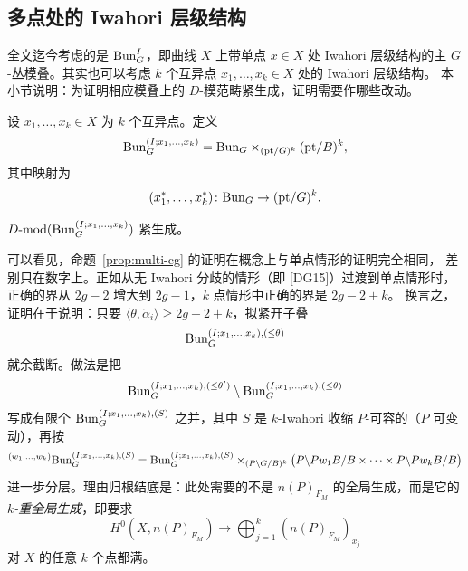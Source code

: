 
\subsection{多点处的 Iwahori 层级结构}
\label{sec:multi}

全文迄今考虑的是 $\mathrm{Bun}^I_G$，即曲线 $X$ 上带单点 $x\in X$ 处 Iwahori 层级结构的主
$G$-丛模叠。其实也可以考虑 $k$ 个互异点 $x_1,\dots,x_k\in X$ 处的 Iwahori 层级结构。
本小节说明：为证明相应模叠上的 $D$-模范畴紧生成，证明需要作哪些改动。

\begin{definition}
\label{def:multi-bunI}
设 $x_1,\dots,x_k\in X$ 为 $k$ 个互异点。定义
\[
\mathrm{Bun}^{(I;x_1,\dots,x_k)}_G=\mathrm{Bun}_G\times_{(\mathrm{pt}/G)^k}(\mathrm{pt}/B)^k,
\]
其中映射为
\[
(x_1^*,\dots,x_k^*)\colon \mathrm{Bun}_G\to (\mathrm{pt}/G)^k .
\]
\end{definition}

\begin{proposition}
\label{prop:multi-cg}
$D\text{-}\mathrm{mod}(\mathrm{Bun}^{(I;x_1,\dots,x_k)}_G)$ 紧生成。
\end{proposition}

可以看见，命题~\ref{prop:multi-cg} 的证明在概念上与单点情形的证明完全相同，
差别只在数字上。正如从无 Iwahori 分歧的情形（即 [DG15]）过渡到单点情形时，
正确的界从 $2g-2$ 增大到 $2g-1$，$k$ 点情形中正确的界是 $2g-2+k$。
换言之，证明在于说明：只要 $\langle\theta,\check\alpha_i\rangle\ge 2g-2+k$，拟紧开子叠
\[
\mathrm{Bun}^{(I;x_1,\dots,x_k),(\le\theta)}_G
\]
就余截断。做法是把
\[
\mathrm{Bun}^{(I;x_1,\dots,x_k),(\le\theta')}_G
\setminus \mathrm{Bun}^{(I;x_1,\dots,x_k),(\le\theta)}_G
\]
写成有限个 $\mathrm{Bun}^{(I;x_1,\dots,x_k),(S)}_G$ 之并，其中 $S$ 是 $k$-Iwahori 收缩
$P$-可容的（$P$ 可变动），再按
\[
{}^{(w_1,\dots,w_k)}\mathrm{Bun}^{(I;x_1,\dots,x_k),(S)}_G
=\mathrm{Bun}^{(I;x_1,\dots,x_k),(S)}_G
\times_{(P\backslash G/B)^k}
\bigl(P\backslash Pw_1B/B\times\cdots\times P\backslash Pw_kB/B\bigr)
\]
进一步分层。理由归根结底是：此处需要的不是 $n(P)_{F_M}$ 的全局生成，而是它的
\emph{$k$-重全局生成}，即要求
\[
H^0(X,n(P)_{F_M})\to \bigoplus_{j=1}^{k}(n(P)_{F_M})_{x_j}
\]
对 $X$ 的任意 $k$ 个点都满。
